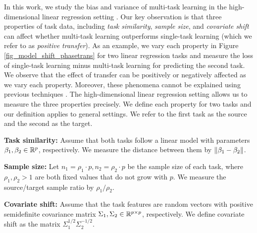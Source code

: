 In this work, we study the bias and variance of multi-task learning in the high-dimensional linear regression setting \cite{HMRT19,BLLT20}.
Our key observation is that three properties of task data, including \textit{task similarity}, \textit{sample size}, and \textit{covariate shift} can affect whether multi-task learning outperforms single-task learning (which we refer to as \textit{positive transfer}).
As an example, we vary each property in Figure \ref{fig_model_shift_phasetrans} for two linear regression tasks and measure the loss of single-task learning minus multi-task learning for predicting the second task.
We observe that the effect of transfer can be positively or negatively affected as we vary each property.
Moreover, these phenomena cannot be explained using previous techniques \cite{WZR20}.
The high-dimensional linear regression setting allows us to measure the three properties precisely.
We define each property for two tasks and our definition applies to general settings.
We refer to the first task as the source and the second as the target.
\squishlist
	\item \textbf{Task similarity:} Assume that both tasks follow a linear model with parameters $\beta_1, \beta_2\in\mathbb{R}^p$, respectively.
	We measure the distance between them by $\|\beta_1 - \beta_2\|$.
	\item \textbf{Sample size:} Let $n_1 = \rho_1 \cdot p, n_2 = \rho_2 \cdot p$ be the sample size of each task, where $\rho_1, \rho_2>1$ are both fixed values that do not grow with $p$.
	We measure the source/target sample ratio by $\rho_1 / \rho_2$.
	\item \textbf{Covariate shift:} Assume that the task features are random vectors with positive semidefinite covariance matrix $\Sigma_1,\Sigma_2\in\mathbb{R}^{p\times p}$, respectively.
	We define covariate shift as the matrix $\Sigma_1^{1/2}\Sigma_2^{-1/2}$.
\squishend


